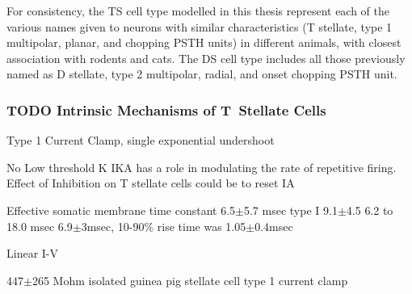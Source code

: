 






 For consistency, the TS cell type modelled in this thesis represent each of the
  various names given to neurons with similar characteristics (T stellate, type 1
  multipolar, planar, and chopping PSTH units) in different animals, with closest
  association with rodents and cats. The DS cell type includes all those previously named as D stellate, type 2
  multipolar, radial, and onset chopping PSTH unit.



 \subsubsection{TODO Intrinsic Mechanisms of T~Stellate Cells}\label{sec:intr-mech-tstellate} %


Type 1 Current Clamp, single exponential undershoot
      \citep{FengKuwadaEtAl:1994,ManisMarx:1991,WuOertel:1984}         
\citep{FujinoOertel:2001,FerragamoGoldingEtAl:1998a} 

\citep{RothmanManis:2003,RothmanManis:2003a,RothmanManis:2003b,Rothman:1999}


No Low threshold
K \citep{ManisMarx:1991} 
IKA has a role in modulating the rate of repetitive
firing.  
Effect of Inhibition on T stellate cells could be to reset IA \citep{RothmanManis:2003b}                       

Effective somatic membrane time constant 6.5{$\pm$}5.7 msec \citep{ManisMarx:1991}
type I 9.1{$\pm$}4.5 \citep{ManisMarx:1991} 
6.2 to 18.0 msec
\citep{FengKuwadaEtAl:1994} 6.9{$\pm$}3msec, 10-90\% rise time was
         1.05{$\pm$}0.4msec \citep{IsaacsonWalmsley:1995}           

Linear I-V                       \citep{ManisMarx:1991}                     

447{$\pm$}265 Mohm isolated guinea pig stellate cell type 1 current clamp
\citep{ManisMarx:1991} 

